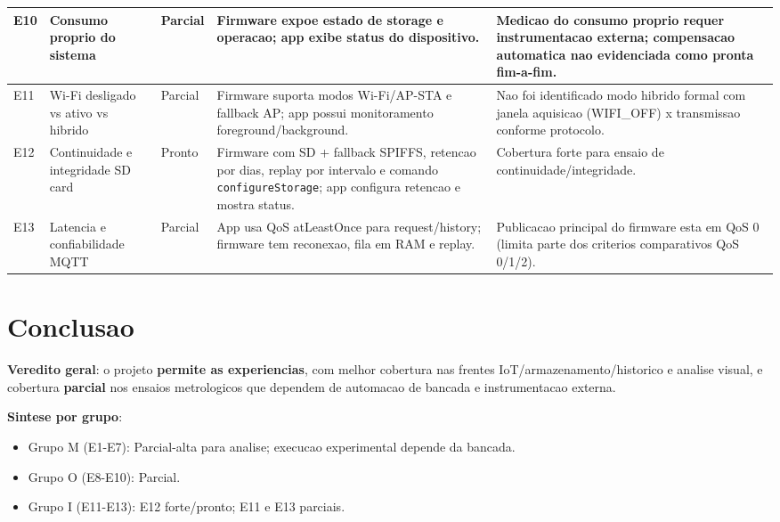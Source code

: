\documentclass[11pt,a4paper]{article}
\begin{document}
\begin{longtable}{L{1cm} L{2.8cm} L{2.1cm} L{6.9cm} L{2.7cm}}
\hline
E10 & Consumo proprio do sistema & Parcial & Firmware expoe estado de storage e operacao; app exibe status do dispositivo. & Medicao do consumo proprio requer instrumentacao externa; compensacao automatica nao evidenciada como pronta fim-a-fim. \\
\hline
E11 & Wi-Fi desligado vs ativo vs hibrido & Parcial & Firmware suporta modos Wi-Fi/AP-STA e fallback AP; app possui monitoramento foreground/background. & Nao foi identificado modo hibrido formal com janela aquisicao (WIFI\_OFF) x transmissao conforme protocolo. \\
\hline
E12 & Continuidade e integridade SD card & Pronto & Firmware com SD + fallback SPIFFS, retencao por dias, replay por intervalo e comando \texttt{configureStorage}; app configura retencao e mostra status. & Cobertura forte para ensaio de continuidade/integridade. \\
\hline
E13 & Latencia e confiabilidade MQTT & Parcial & App usa QoS atLeastOnce para request/history; firmware tem reconexao, fila em RAM e replay. & Publicacao principal do firmware esta em QoS 0 (limita parte dos criterios comparativos QoS 0/1/2). \\
\hline
\end{longtable}

\section*{Conclusao}
\textbf{Veredito geral}: o projeto \textbf{permite as experiencias}, com melhor cobertura nas frentes
IoT/armazenamento/historico e analise visual, e cobertura \textbf{parcial} nos ensaios metrologicos
que dependem de automacao de bancada e instrumentacao externa.

\textbf{Sintese por grupo}:
\begin{itemize}
  \item Grupo M (E1-E7): Parcial-alta para analise; execucao experimental depende da bancada.
  \item Grupo O (E8-E10): Parcial.
  \item Grupo I (E11-E13): E12 forte/pronto; E11 e E13 parciais.
\end{itemize}
\end{document}
